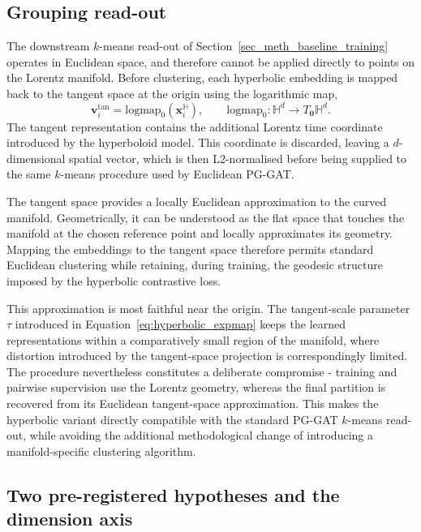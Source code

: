 \subsection{Grouping read-out}
\label{sec_meth_hyperbolic_readout}

The downstream $k$-means read-out of
Section~\ref{sec_meth_baseline_training} operates in Euclidean space,
and therefore cannot be applied directly to points on the Lorentz
manifold.
Before clustering,
each hyperbolic embedding is mapped back
to the tangent space at the origin using the logarithmic map,
\begin{equation}
    \mathbf{v}^{\text{tan}}_i
    =
    \mathrm{logmap}_{0}
    \left(
        \mathbf{x}^{\mathbb{H}}_i
    \right),
    \qquad
    \mathrm{logmap}_{0} :
    \mathbb{H}^{d}
    \rightarrow
    T_{\mathbf{0}}\mathbb{H}^{d}.
    \label{eq:hyperbolic_logmap}
\end{equation}
The tangent representation contains the additional Lorentz time
coordinate introduced by the hyperboloid model.
This coordinate is discarded,
leaving a $d$-dimensional spatial vector,
which is then L2-normalised before being supplied to the same $k$-means
procedure used by Euclidean PG-GAT.

The tangent space provides a locally Euclidean approximation
to the curved manifold.
Geometrically,
it can be understood as the flat space that touches the manifold
at the chosen reference point and locally approximates its geometry.
Mapping the embeddings to the tangent space therefore permits
standard Euclidean clustering
while retaining, during training,
the geodesic structure imposed by the hyperbolic contrastive loss.

This approximation is most faithful near the origin.
The tangent-scale parameter $\tau$ introduced in
Equation~\eqref{eq:hyperbolic_expmap} keeps the learned representations
within a comparatively small region of the manifold,
where distortion introduced by the tangent-space projection
is correspondingly limited.
The procedure nevertheless constitutes a deliberate compromise -
training and pairwise supervision use the Lorentz geometry,
whereas the final partition is recovered from its Euclidean
tangent-space approximation.
This makes the hyperbolic variant directly compatible
with the standard PG-GAT $k$-means read-out,
while avoiding the additional methodological change
of introducing a manifold-specific clustering algorithm.

\subsection{Two pre-registered hypotheses and the dimension axis}
\label{sec_meth_hyperbolic_hypotheses}

